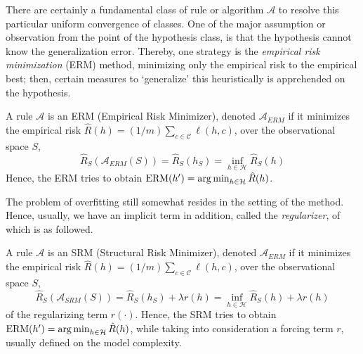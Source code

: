 \documentclass[
  journal=largetwo,
  year=2025,
  volume=37,
]{cup-journal}
\begin{document}
There are certainly a fundamental class of rule or algorithm $\mathcal{A}$ to resolve this particular uniform convergence of classes. One of the major assumption or observation from the point of the hypothesis class, is that the hypothesis cannot know the generalization error. Thereby, one strategy is the \textit{empirical risk minimization} (ERM) method, minimizing only the empirical risk to the empirical best; then, certain measures to `generalize' this heuristically is apprehended on the hypothesis. 

\begin{definition}
    A rule $\mathcal{A}$ is an ERM (Empirical Risk Minimizer), denoted $\mathcal{A}_{ERM}$ if it minimizes the empirical risk $\hat{R}(h)=(1/m)\sum_{c\in\mathcal{C}}\ell(h,c)$, over the observational space $S$, 
    \begin{equation}
        \hat{R}_{S}(\mathcal{A}_{ERM}(S)) = \hat{R}_{S} (h_{S}) = \inf_{h\in\mathcal{H}} \hat{R}_{S}(h) 
    \end{equation}
    Hence, the ERM tries to obtain $\mathrm{ERM}(h') = \operatorname*{arg\,min}_{h\in \mathcal{H}} \hat{R}(h)$. 
\end{definition}

The problem of overfitting still somewhat resides in the setting of the method. Hence, usually, we have an implicit term in addition, called the \textit{regularizer}, of which is as followed. 

\begin{definition}
    A rule $\mathcal{A}$ is an SRM (Structural Risk Minimizer), denoted $\mathcal{A}_{ERM}$ if it minimizes the empirical risk $\hat{R}(h)=(1/m)\sum_{c\in\mathcal{C}}\ell(h,c)$, over the observational space $S$, 
    \begin{equation}
        \hat{R}_{S}(\mathcal{A}_{SRM}(S)) = \hat{R}_{S} (h_{S}) + \lambda r(h)= \inf_{h\in\mathcal{H}} \hat{R}_{S}(h) + \lambda r(h)
    \end{equation}
    of the regularizing term $r(\cdot)$. Hence, the SRM tries to obtain $\mathrm{ERM}(h') = \operatorname*{arg\,min}_{h\in \mathcal{H}} \hat{R}(h)$, while taking into consideration a forcing term $r$, usually defined on the model complexity. 
\end{definition}
\end{document}
